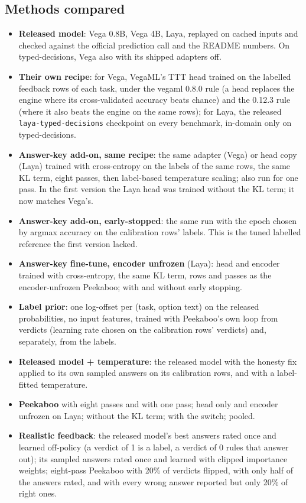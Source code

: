 \documentclass[11pt]{article}
\newcommand{\pk}{Peekaboo}
\begin{document}
\subsection{Methods compared}
\begin{itemize}
\item \textbf{Released model}: Vega 0.8B, Vega 4B, Laya, replayed on cached inputs and checked against the official prediction call and the README numbers. On typed-decisions, Vega also with its shipped adapters off.
\item \textbf{Their own recipe}: for Vega, VegaML's TTT head trained on the labelled feedback rows of each task, under the vegaml 0.8.0 rule (a head replaces the engine where its cross-validated accuracy beats chance) and the 0.12.3 rule (where it also beats the engine on the same rows); for Laya, the released \texttt{laya-typed-decisions} checkpoint on every benchmark, in-domain only on typed-decisions.
\item \textbf{Answer-key add-on, same recipe}: the same adapter (Vega) or head copy (Laya) trained with cross-entropy on the labels of the same rows, the same KL term, eight passes, then label-based temperature scaling; also run for one pass. In the first version the Laya head was trained without the KL term; it now matches Vega's.
\item \textbf{Answer-key add-on, early-stopped}: the same run with the epoch chosen by argmax accuracy on the calibration rows' labels. This is the tuned labelled reference the first version lacked.
\item \textbf{Answer-key fine-tune, encoder unfrozen} (Laya): head and encoder trained with cross-entropy, the same KL term, rows and passes as the encoder-unfrozen \pk{}; with and without early stopping.
\item \textbf{Label prior}: one log-offset per (task, option text) on the released probabilities, no input features, trained with \pk{}'s own loop from verdicts (learning rate chosen on the calibration rows' verdicts) and, separately, from the labels.
\item \textbf{Released model + temperature}: the released model with the honesty fix applied to its own sampled answers on its calibration rows, and with a label-fitted temperature.
\item \textbf{\pk{}} with eight passes and with one pass; head only and encoder unfrozen on Laya; without the KL term; with the switch; pooled.
\item \textbf{Realistic feedback}: the released model's best answers rated once and learned off-policy (a verdict of 1 is a label, a verdict of 0 rules that answer out); its sampled answers rated once and learned with clipped importance weights; eight-pass \pk{} with 20\% of verdicts flipped, with only half of the answers rated, and with every wrong answer reported but only 20\% of right ones.
\end{itemize}
\end{document}
